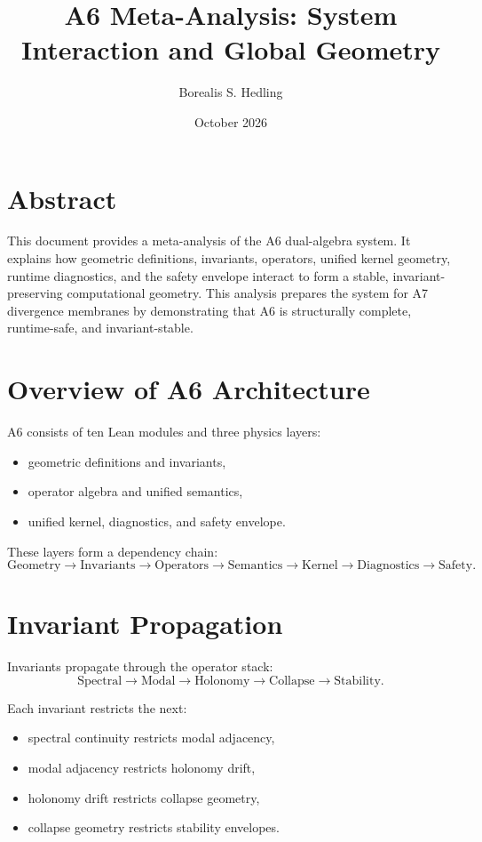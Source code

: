 \documentclass[11pt]{article}
\title{A6 Meta-Analysis: System Interaction and Global Geometry}
\author{Borealis S. Hedling}
\date{October 2026}
\begin{document}
\maketitle

\section*{Abstract}
This document provides a meta-analysis of the A6 dual-algebra system. It explains
how geometric definitions, invariants, operators, unified kernel geometry,
runtime diagnostics, and the safety envelope interact to form a stable,
invariant-preserving computational geometry. This analysis prepares the system
for A7 divergence membranes by demonstrating that A6 is structurally complete,
runtime-safe, and invariant-stable.

\section{Overview of A6 Architecture}
A6 consists of ten Lean modules and three physics layers:
\begin{itemize}
  \item geometric definitions and invariants,
  \item operator algebra and unified semantics,
  \item unified kernel, diagnostics, and safety envelope.
\end{itemize}

These layers form a dependency chain:
\[
\text{Geometry} \to \text{Invariants} \to \text{Operators} \to
\text{Semantics} \to \text{Kernel} \to \text{Diagnostics} \to \text{Safety}.
\]

\section{Invariant Propagation}
Invariants propagate through the operator stack:
\[
\text{Spectral} \to \text{Modal} \to \text{Holonomy} \to
\text{Collapse} \to \text{Stability}.
\]

Each invariant restricts the next:
\begin{itemize}
  \item spectral continuity restricts modal adjacency,
  \item modal adjacency restricts holonomy drift,
  \item holonomy drift restricts collapse geometry,
  \item collapse geometry restricts stability envelopes.
\end{itemize}
\end{document}
